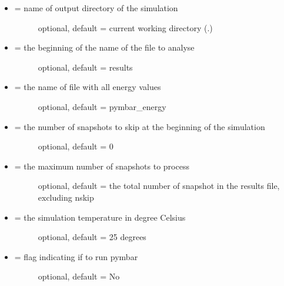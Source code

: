 \documentclass[letterpaper,10pt,english]{sphinxmanual}
\begin{document}
\begin{itemize}
\item {} \begin{description}
\item[{ = name of output directory of the simulation}] \leavevmode
optional, default = current working directory (.)

\end{description}

\item {} \begin{description}
\item[{ = the beginning of the name of the file to analyse}] \leavevmode
optional, default = results

\end{description}

\item {} \begin{description}
\item[{ = the name of file with all energy values}] \leavevmode
optional, default = pymbar\_energy

\end{description}

\item {} \begin{description}
\item[{ = the number of snapshots to skip at the beginning of the simulation}] \leavevmode
optional, default = 0

\end{description}

\item {} \begin{description}
\item[{ = the maximum number of snapshots to process}] \leavevmode
optional, default = the total number of snapshot in the results file, excluding nskip

\end{description}

\item {} \begin{description}
\item[{ = the simulation temperature in degree Celsius}] \leavevmode
optional, default = 25 degrees

\end{description}

\item {} \begin{description}
\item[{ = flag indicating if to run pymbar}] \leavevmode
optional, default = No

\end{description}

\end{itemize}
\end{document}
